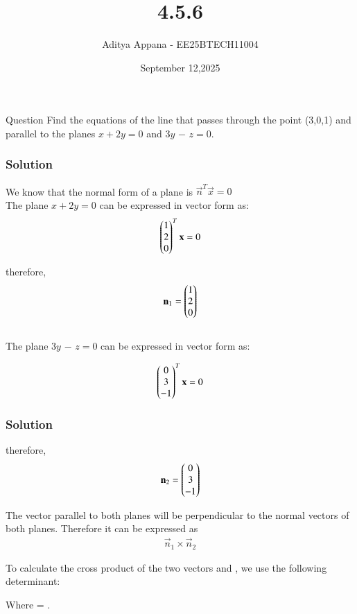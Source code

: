 \documentclass{beamer}
\title %
{4.5.6}
\date{September 12,2025}
\author %
{Aditya Appana - EE25BTECH11004}
\begin{document}
\frame{\titlepage}
\begin{frame}{Question}
Find the equations of the line that passes through the point (3,0,1) and parallel to the
planes $x + 2y = 0$ and $3y$ $-$ $z = 0$.
\end{frame}



\begin{frame}[fragile]
    \frametitle{Solution}

We know that the normal form of a plane is $\vec{n}^T\vec{x} = 0$ \\
The plane $x + 2y = 0$ can be expressed in vector form as:
\begin{align}
    \begin{pmatrix}1\\2\\0\end{pmatrix}^T\mathbf{x} = 0
\end{align} 

therefore, \begin{align}\mathbf{n}_1 = \begin{pmatrix}1\\2\\0\end{pmatrix}\end{align} \\
The plane $3y$ $-$ $z=0$ can be expressed in vector form as:

\begin{align}
    \begin{pmatrix}0 \\ 3 \\-1\end{pmatrix}^T\mathbf{x} = 0
\end{align}
\end{frame}


\begin{frame}[fragile]
    \frametitle{Solution}
therefore, \begin{align}\mathbf{n}_2 = \begin{pmatrix}0\\3\\-1\end{pmatrix} \end{align}

The vector parallel to both planes will be perpendicular to the normal vectors of both planes. Therefore it can be expressed as
\begin{align} \vec{n}_1 \times \vec{n}_2 \end{align}

To calculate the cross product of the two vectors  and , we use the following determinant:
\begin{center}
\end{center}
Where  = .
\end{frame}
\end{document}
